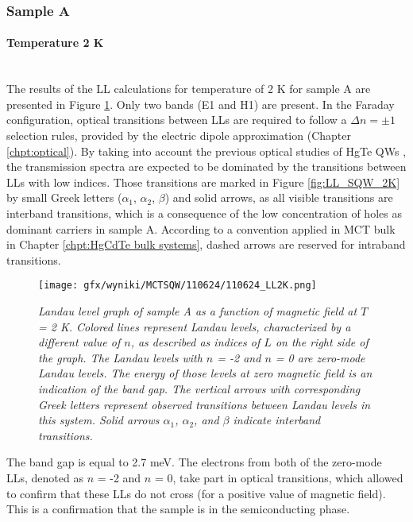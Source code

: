 \documentclass[titlepage,a4paper]{book}
\newcommand{\wciecie}{\quad\phantom{v}}
\newcommand{\myparagraph}[1]{\paragraph{#1}\mbox{}\\}
\begin{document}
\subsubsection{Sample A}
\myparagraph{Temperature 2 K}
\wciecie
The results of the LL calculations for temperature of 2 K for sample A are presented in Figure \ref{fig:LL_110624_2K}. Only two bands (E1 and H1) are present. In the Faraday configuration, optical transitions between LLs are required to follow a $\Delta n = \pm 1$ selection rules, provided by the electric dipole approximation (Chapter \ref{chpt:optical}). By taking into account the previous optical studies of HgTe QWs \cite{Schultz}\cite{Orlita_MCT_QW}\cite{Zholudev_MCT_QW}\cite{Ikonnikov_MCT_SQW}\cite{Ludwig_MCT_QW}\cite{Zholudev_MCT_QW_anticrossing}, the transmission spectra are expected to be dominated by the transitions between LLs with low indices. Those transitions are marked in Figure \ref{fig:LL_SQW_2K} by small Greek letters ($\alpha_1$, $\alpha_2$, $\beta$) and solid arrows, as all visible transitions are interband transitions, which is a consequence of the low concentration of holes as dominant carriers in sample A. According to a convention applied in MCT bulk in Chapter \ref{chpt:HgCdTe bulk systems}, dashed arrows are reserved for intraband transitions. 

\begin{figure}[ht]
	\centering
	\texttt{[image: gfx/wyniki/MCTSQW/110624/110624\_LL2K.png]}
	\vspace{-10pt}
	\caption{\textit{Landau level graph of sample A as a function of magnetic field at $T$ = 2 K. Colored lines represent Landau levels, characterized by a different value of $n$, as described as indices of $L$ on the right side of the graph. The Landau levels with $n$ = -2 and $n$ = 0 are zero-mode Landau levels. The energy of those levels at zero magnetic field is an indication of the band gap. The vertical arrows with corresponding Greek letters represent observed transitions between Landau levels in this system. Solid arrows $\alpha_1$, $\alpha_2$, and $\beta$ indicate interband transitions.}}
	\label{fig:LL_110624_2K}
\end{figure}

The band gap is equal to 2.7 meV. The electrons from both of the zero-mode LLs, denoted as $n$ = -2 and $n$ = 0, take part in optical transitions, which allowed to confirm that these LLs do not cross (for a positive value of magnetic field). This is a confirmation that the sample is in the semiconducting phase. 
\end{document}

